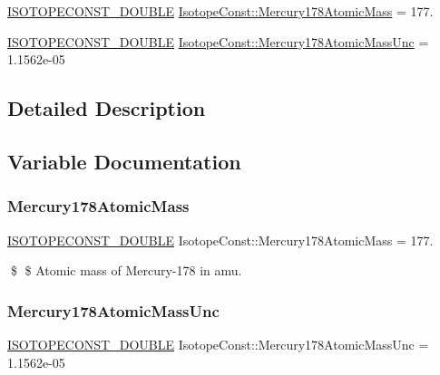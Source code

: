 \begin{DoxyCompactItemize}
\item 
\mbox{\hyperlink{group___isotope_const-_macros_ga8f45a7272ce02c0b4c65c44636ed719a}{I\+S\+O\+T\+O\+P\+E\+C\+O\+N\+S\+T\+\_\+\+D\+O\+U\+B\+LE}} \mbox{\hyperlink{group___isotope_const-_mercury-_hg178_gad849cbf2ff66f1f2cd318cb0742dc1e6}{Isotope\+Const\+::\+Mercury178\+Atomic\+Mass}} = 177.
\item 
\mbox{\hyperlink{group___isotope_const-_macros_ga8f45a7272ce02c0b4c65c44636ed719a}{I\+S\+O\+T\+O\+P\+E\+C\+O\+N\+S\+T\+\_\+\+D\+O\+U\+B\+LE}} \mbox{\hyperlink{group___isotope_const-_mercury-_hg178_ga1c83881d5ab05ea4c39558909d38e6b9}{Isotope\+Const\+::\+Mercury178\+Atomic\+Mass\+Unc}} = 1.\+1562e-\/05
\end{DoxyCompactItemize}


\subsection{Detailed Description}


\subsection{Variable Documentation}
\mbox{\label{group___isotope_const-_mercury-_hg178_gad849cbf2ff66f1f2cd318cb0742dc1e6}} 
\subsubsection{\texorpdfstring{Mercury178\+Atomic\+Mass}{Mercury178AtomicMass}}
{\footnotesize\ttfamily \mbox{\hyperlink{group___isotope_const-_macros_ga8f45a7272ce02c0b4c65c44636ed719a}{I\+S\+O\+T\+O\+P\+E\+C\+O\+N\+S\+T\+\_\+\+D\+O\+U\+B\+LE}} Isotope\+Const\+::\+Mercury178\+Atomic\+Mass = 177.}

\$ \$ Atomic mass of Mercury-\/178 in amu. \mbox{\label{group___isotope_const-_mercury-_hg178_ga1c83881d5ab05ea4c39558909d38e6b9}} 
\subsubsection{\texorpdfstring{Mercury178\+Atomic\+Mass\+Unc}{Mercury178AtomicMassUnc}}
{\footnotesize\ttfamily \mbox{\hyperlink{group___isotope_const-_macros_ga8f45a7272ce02c0b4c65c44636ed719a}{I\+S\+O\+T\+O\+P\+E\+C\+O\+N\+S\+T\+\_\+\+D\+O\+U\+B\+LE}} Isotope\+Const\+::\+Mercury178\+Atomic\+Mass\+Unc = 1.\+1562e-\/05}

